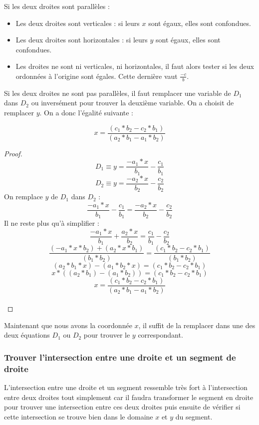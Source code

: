 \documentclass[]{article}
\begin{document}
Si les deux droites sont parallèles : 
\begin{itemize}
    \item Les deux droites sont verticales : si leurs $x$ sont égaux, elles sont confondues.
    \item Les deux droites sont horizontales : si leurs $y$ sont égaux, elles sont confondues.
    \item Les droites ne sont ni verticales, ni horizontales, il faut alors tester si les deux
        ordonnées à l'origine sont égales. Cette dernière vaut $\frac{-c}{b}$. \\
\end{itemize}

Si les deux droites ne sont pas parallèles, il faut remplacer une variable de $D_1$ dans $D_2$
ou inversément pour trouver la deuxième variable. On a choisit de remplacer $y$.
On a donc l'égalité suivante : 

$$ x = \frac{(c_1 * b_2 - c_2 * b_1)}{(a_2 * b_1 - a_1 * b_2)} $$

\begin{proof}
$$ D_1 \equiv y = \frac{-a_1 * x}{b_1} - \frac{c_1}{b_1} $$
$$ D_2 \equiv y = \frac{-a_2 * x}{b_2} - \frac{c_2}{b_2} $$
On remplace $y$ de $D_1$ dans $D_2$ :
$$ \frac{-a_1 * x}{b_1} - \frac{c_1}{b_1} = \frac{-a_2 * x}{b_2} - \frac{c_2}{b_2} $$
Il ne reste plus qu'à simplifier :
$$ \frac{-a_1 * x}{b_1} + \frac{a_2 * x}{b_2} = \frac{c_1}{b_1} - \frac{c_2}{b_2} $$
$$ \frac{(-a_1 * x * b_2) + (a_2 * x * b_1)}{(b_1 * b_2)} = \frac{(c_1 * b_2 - c_2 * b_1)}{(b_1 * b_2)} $$
$$ (a_2 * b_1 * x) - (a_1 * b_2 * x) = (c_1 * b_2 - c_2 * b_1) $$
$$ x * ((a_2 * b_1) - (a_1 * b_2)) = (c_1 * b_2 - c_2 * b_1) $$
$$ x = \frac{(c_1 * b_2 - c_2 * b_1)}{(a_2 * b_1 - a_1 * b_2)} $$ \\
\end{proof}

Maintenant que nous avons la coordonnée $x$, il suffit de la remplacer
dans une des deux équations $D_1$ ou $D_2$ pour trouver le $y$ 
correspondant.

\subsubsection{Trouver l'intersection entre une droite et un segment de droite}

L'intersection entre une droite et un segment ressemble très fort
à l'intersection entre deux droites tout simplement car il faudra transformer
le segment en droite pour trouver une intersection entre ces deux droites
puis ensuite de vérifier si cette intersection se trouve bien dans le domaine
$x$ et $y$ du segment.
\end{document}
